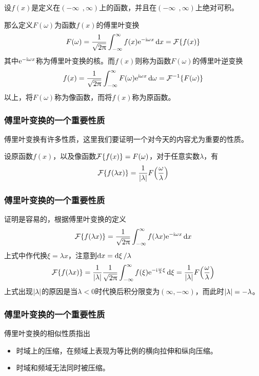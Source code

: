\begin{frame}
    \begin{theorem}[傅里叶变换]
        设$f(x)$是定义在$(-\infty~~,\infty)$上的函数，并且在$(-\infty~~,\infty)$上绝对可积。

        那么定义$F(\omega)$为函数$f(x)$的傅里叶变换
        \begin{equation}
            F(\omega)=\frac{1}{\sqrt{2\pi}}\Int[-\infty][\infty]f(x)\e^{-\i\omega x}\dd{x}=\F{f(x)}
        \end{equation}
        其中$\mathrm{e}^{-\mathrm{i}\omega x}$称为傅里叶变换的核。而$f(x)$则称为函数$F(\omega)$的傅里叶逆变换
        \begin{equation}
            f(x)=\frac{1}{\sqrt{2\pi}}\Int[-\infty][\infty]F(\omega)\e^{\i\omega x}\dd{\omega}=\F*{F(\omega)}
        \end{equation}
        以上，将$F(\omega)$称为像函数，而将$f(x)$称为原函数。
    \end{theorem}  
\end{frame}

\begin{frame}
    \frametitle{傅里叶变换的一个重要性质}

    傅里叶变换有许多性质，这里我们要证明一个对今天的内容尤为重要的性质。

    \begin{theorem}[傅里叶变换的相似性质]
        设原函数$f(x)$，以及像函数$\F{f(x)}=F(\omega)$，对于任意实数$\lambda$，有
        \begin{equation}
            \F{f(\lambda x)}=\frac{1}{\abs{\lambda}}F\qty(\frac{\omega}{\lambda})
        \end{equation}
    \end{theorem}
\end{frame}

\begin{frame}
    \frametitle{傅里叶变换的一个重要性质}
    证明是容易的，根据傅里叶变换的定义
    \begin{equation}
        \F{f(\lambda x)}=\frac{1}{\sqrt{2\pi}}\Int[-\infty][\infty]{f(\lambda x)\e^{-\i\omega x}\dx}
    \end{equation}
    上式中作代换$\xi=\lambda x$，注意到$\dd{x}=\dd{\xi}/\lambda$
    \begin{equation}
        \F{f(\lambda x)}=\frac{1}{\abs{\lambda}}\frac{1}{\sqrt{2\pi}}\Int[-\infty][\infty]f(\xi)\e^{-\i\frac{\omega}{\lambda}\xi}\dd{\xi}=\frac{1}{\abs{\lambda}}F\qty(\frac{\omega}{\lambda})
    \end{equation}
    上式出现$\abs{\lambda}$的原因是当$\lambda<0$时代换后积分限变为$(\infty,-\infty)$，而此时$\abs{\lambda}=-\lambda$。
\end{frame}

\begin{frame}
    \frametitle{傅里叶变换的一个重要性质}
    傅里叶变换的相似性质指出
    \begin{itemize}
        \item 时域上的压缩，在频域上表现为等比例的横向拉伸和纵向压缩。
        \item 时域和频域无法同时被压缩。
    \end{itemize}
\end{frame}